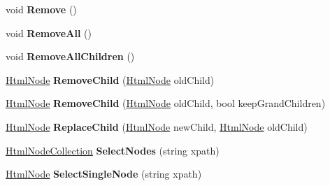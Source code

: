 \begin{DoxyCompactItemize}
\item 
\mbox{\label{class_html_agility_pack_1_1_html_node_a5ce8d28c061c20981e8b1f9e44f27f95}} 
void {\bfseries Remove} ()
\item 
\mbox{\label{class_html_agility_pack_1_1_html_node_a046ef0f6d482e429c4f48056a8464060}} 
void {\bfseries Remove\+All} ()
\item 
\mbox{\label{class_html_agility_pack_1_1_html_node_ae565d81a4648fb3c6d5bd95fc91e2d29}} 
void {\bfseries Remove\+All\+Children} ()
\item 
\mbox{\label{class_html_agility_pack_1_1_html_node_a100e3e038668cab3505109847ea8b075}} 
\hyperlink{class_html_agility_pack_1_1_html_node}{Html\+Node} {\bfseries Remove\+Child} (\hyperlink{class_html_agility_pack_1_1_html_node}{Html\+Node} old\+Child)
\item 
\mbox{\label{class_html_agility_pack_1_1_html_node_ad9c55b1e284a40dd55ba42712f4e7074}} 
\hyperlink{class_html_agility_pack_1_1_html_node}{Html\+Node} {\bfseries Remove\+Child} (\hyperlink{class_html_agility_pack_1_1_html_node}{Html\+Node} old\+Child, bool keep\+Grand\+Children)
\item 
\mbox{\label{class_html_agility_pack_1_1_html_node_a17e6fac6c6e8189d1aae612fe66a9924}} 
\hyperlink{class_html_agility_pack_1_1_html_node}{Html\+Node} {\bfseries Replace\+Child} (\hyperlink{class_html_agility_pack_1_1_html_node}{Html\+Node} new\+Child, \hyperlink{class_html_agility_pack_1_1_html_node}{Html\+Node} old\+Child)
\item 
\mbox{\label{class_html_agility_pack_1_1_html_node_a318c0ba0b18bd3e02cd71d28eded83ab}} 
\hyperlink{class_html_agility_pack_1_1_html_node_collection}{Html\+Node\+Collection} {\bfseries Select\+Nodes} (string xpath)
\item 
\mbox{\label{class_html_agility_pack_1_1_html_node_aa3fda9875d81027009b9d15b51c77add}} 
\hyperlink{class_html_agility_pack_1_1_html_node}{Html\+Node} {\bfseries Select\+Single\+Node} (string xpath)

\end{DoxyCompactItemize}
